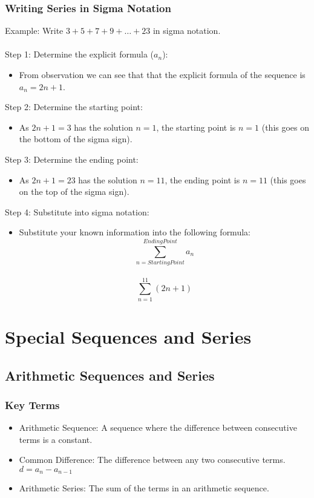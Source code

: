 \documentclass[12pt]{article}
\begin{document}
\subsubsection{Writing Series in Sigma Notation}
Example: Write $3 + 5 + 7 + 9 + \dots + 23$ in sigma notation. \\ \\
Step 1: Determine the explicit formula ($a_n$):
\begin{itemize}
    \item From observation we can see that that the explicit formula of the sequence is $a_n = 2n + 1$.
\end{itemize}
Step 2: Determine the starting point:
\begin{itemize}
    \item As $2n + 1 = 3$ has the solution $n = 1$, the starting point is $n = 1$ (this goes on the bottom of the sigma sign).
\end{itemize}
Step 3: Determine the ending point:
\begin{itemize}
    \item As $2n + 1 = 23$ has the solution $n = 11$, the ending point is $n = 11$ (this goes on the top of the sigma sign).
\end{itemize}
Step 4: Substitute into sigma notation:
\begin{itemize}
    \item Substitute your known information into the following formula:
    $$\sum_{n=Starting Point}^{Ending Point} a_n$$ \\
    $$\sum_{n=1}^{11} (2n+1)$$
\end{itemize} \newpage

\section{Special Sequences and Series}
\subsection{Arithmetic Sequences and Series}
\subsubsection{Key Terms}
\begin{itemize}
    \item Arithmetic Sequence: A sequence where the difference between consecutive terms is a constant.
    \item Common Difference: The difference between any two consecutive terms. $d = a_n - a_{n-1}$
    \item Arithmetic Series: The sum of the terms in an arithmetic sequence.
\end{itemize}
\end{document}

